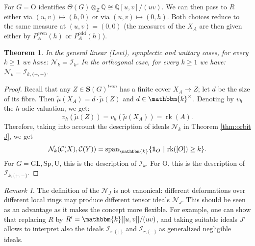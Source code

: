 \documentclass[11pt,a4paper]{amsart}
\theoremstyle{plain}%
\newtheorem{theorem}[lemma]{Theorem}
\theoremstyle{definition}
\theoremstyle{remark}
\newtheorem{remark}[lemma]{Remark}
\newcommand{\Span}{\mathrm{span}}
\newcommand{\rk}{{\operatorname{rk}}}
\newcommand{\kk}{\mathbbm{k}}
\newcommand{\one}{{\mathbf{1}}}
\newcommand{\I}{\mathcal{I}}
\newcommand{\Set}[1]{\mathbf{S}(#1)}
\begin{document}
For $G= \mathrm{O}$ \cite[Theorem~9.12 and Corollary~9.13]{HS-classical} identifies $\Theta(G)\otimes_{\mathbb Z}\mathbb Q\cong \mathbb Q[u,v]/(uv)$. We can then pass to $R$ either via  $(u,v)\mapsto(h,0)$ or via $(u,v)\mapsto(0,h)$. Both choices reduce to the same measure at $(u,v)=(0,0)$ (the measures of the $X_A$ are then given either by $P_A^{\mathrm{even}}(h)$ or 
$P_A^{\mathrm{odd}}(h)$).

\begin{theorem}\label{thm:classical-Nk}
In the general linear (Levi), symplectic and unitary cases, for every $k\geq1$ we have: $\mathcal{N}_k=\I_k$.
In the orthogonal case, for every $k\geq1$ we have: $\mathcal{N}_k=\I_{k,\{+,-\}}$.
\end{theorem}

\begin{proof} Recall that any $Z \in \Set{G}^{tran}$ has a finite cover $X_A \to Z$; let $d$ be the size of its fibre. Then $\tilde{\mu}(X_A)=d\cdot\tilde{\mu}(Z)$ and $d\in \kk^{\times}$. Denoting by $v_h$ the $h$-adic valuation, we get: $$ v_h(\tilde{\mu}(Z)) =v_h(\tilde{\mu}(X_A))= \rk(A).$$ Therefore, taking into account the description of ideals $\mathcal N_k$ in Theorem \ref{thm:orbit J}, we get  
\[
 \mathcal N_k(\mathcal{C}(X),\mathcal{C}(Y))
 =\Span_{\kk}\{\one_O \ | \ \rk([O])\geq k\}.
\]
For $G=\mathrm{GL},\mathrm{Sp},\mathrm U$, this is the description of $\mathcal I_{{k}}$. For $\mathrm O$, this is the description of 
$\mathcal I_{{k},\{+,-\}}$.
\end{proof}


\begin{remark} The definition of the $\mathcal{N}_{{J}}$ is not canonical: different deformations over different local rings may produce different tensor ideals $\mathcal{N}_{{J}}$. This should be seen as an advantage as it makes the concept more flexible. For example, one can show that replacing $R$ by $R' = \kk[[u,v]]/(uv)$, and taking suitable ideals $J'$ allows to interpret also the ideals $\I_{r,\{+\}}$ and $\I_{r,\{-\}}$ as generalized negligible ideals. 
\end{remark}



\printbibliography
\end{document}
